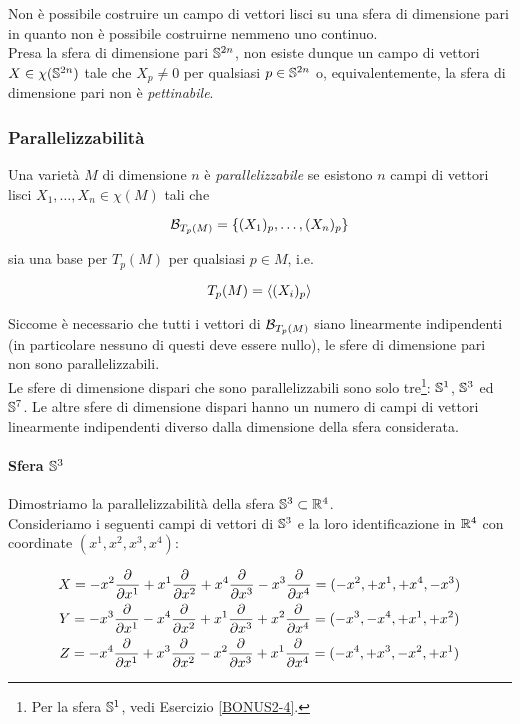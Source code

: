 Non è possibile costruire un campo di vettori lisci su una sfera di dimensione pari in quanto non è possibile costruirne nemmeno uno continuo. \\
Presa la sfera di dimensione pari $ \S^{2n} $, non esiste dunque un campo di vettori $ X \in \chi(\S^{2n}) $ tale che $ X_{p} \neq 0 $ per qualsiasi $ p \in \S^{2n} $ o, equivalentemente, la sfera di dimensione pari non è \textit{pettinabile}.

\subsubsection{Parallelizzabilità}

Una varietà $ M $ di dimensione $ n $ è \textit{parallelizzabile} se esistono $ n $ campi di vettori lisci $ X_{1},\dots,X_{n} \in \chi(M) $ tali che

\begin{equation}
	\B_{T_{p}(M)} = \{ (X_{1})_{p},\dots,(X_{n})_{p} \}
\end{equation}

sia una base per $ T_{p}(M) $ per qualsiasi $ p \in M $, i.e.

\begin{equation}
	T_{p}(M) = \ev{ (X_{i})_{p} }
\end{equation}

Siccome è necessario che tutti i vettori di $ \B_{T_{p}(M)} $ siano linearmente indipendenti (in particolare nessuno di questi deve essere nullo), le sfere di dimensione pari non sono parallelizzabili. \\
Le sfere di dimensione dispari che sono parallelizzabili sono solo tre\footnote{%
	Per la sfera $ \S^{1} $, vedi Esercizio \ref{BONUS2-4}.%
}: $ \S^{1} $, $ \S^{3} $ ed $ \S^{7} $. Le altre sfere di dimensione dispari hanno un numero di campi di vettori linearmente indipendenti diverso dalla dimensione della sfera considerata.

\paragraph{Sfera $ \S^{3} $}

Dimostriamo la parallelizzabilità della sfera $ \S^{3} \subset \R^{4} $. \\
Consideriamo i seguenti campi di vettori di $ \S^{3} $ e la loro identificazione in $ \R^{4} $ con coordinate $ (x^{1},x^{2},x^{3},x^{4}) $:

\begin{gather}
	X = - x^{2} \pdv{x^{1}} + x^{1} \pdv{x^{2}} + x^{4} \pdv{x^{3}} - x^{3} \pdv{x^{4}} %
	= (-x^{2}, +x^{1}, +x^{4}, -x^{3}) \\
	Y = - x^{3} \pdv{x^{1}} - x^{4} \pdv{x^{2}} + x^{1} \pdv{x^{3}} + x^{2} \pdv{x^{4}} = (-x^{3}, -x^{4}, +x^{1}, +x^{2}) \\
	Z = - x^{4} \pdv{x^{1}} + x^{3} \pdv{x^{2}} - x^{2} \pdv{x^{3}} + x^{1} \pdv{x^{4}} = (-x^{4}, +x^{3}, -x^{2}, +x^{1})
\end{gather}

